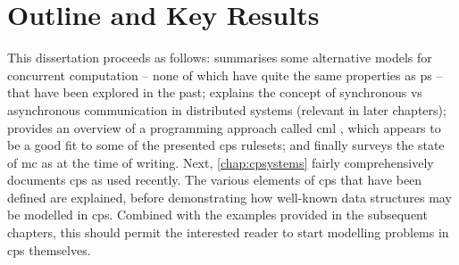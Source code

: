 \section{Outline and Key Results}

This dissertation proceeds as follows:  summarises some alternative models for concurrent computation -- none of which have quite the same properties as \gls{ps} -- that have been explored in the past;  explains the concept of synchronous vs asynchronous communication in distributed systems (relevant in later chapters);  provides an overview of a programming approach called \gls{cml} \cite{Reppy2007,Reppy1991}, which appears to be a good fit to some of the presented \gls{cps} \glspl{ruleset}; and finally surveys the state of \gls{mc} as at the time of writing.  Next, \cref{chap:cpsystems} fairly comprehensively documents \gls{cps} as used recently.  The various elements of \gls{cps} that have been defined are explained, before demonstrating how well-known data structures may be modelled in \gls{cps}.  Combined with the examples provided in the subsequent chapters, this should permit the interested reader to start modelling problems in \gls{cps} themselves.



